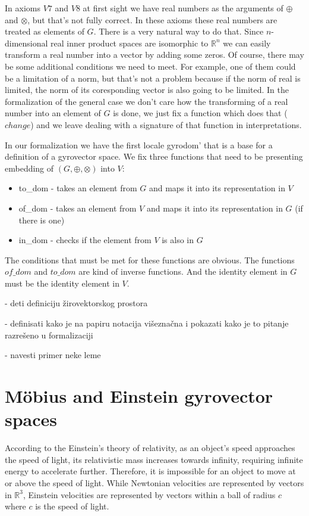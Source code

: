 \documentclass[a4paper]{article}
\theoremstyle{definition}
\begin{document}
In axioms $V7$ and $V8$ at first sight we have real numbers as the arguments of $\oplus$ and $\otimes$, but that's not fully correct. In these axioms these real numbers are treated as elements of $G$. There is a very natural way to do that. Since $n$-dimensional real inner product spaces are isomorphic to $\mathbb{R}^n$ we can easily transform a real number into a vector by adding some zeros. Of course, there may be some additional conditions we need to meet. For example, one of them could be a limitation of a norm, but that's not a problem because if the norm of real is limited,  the norm of its coresponding vector is also going to be limited. In the formalization of the general case we don't care how the transforming of a real number into an element of $G$ is done, we just fix a function which does that ($change$) and we leave dealing with a signature of that function in interpretations.


In our formalization we have the first locale gyrodom' that is a base for a definition of a gyrovector space. We fix three functions that need to be presenting embedding of $(G, \oplus, \otimes)$ into $V$: 
\begin{itemize}
\item to\_dom - takes an element from $G$ and maps it into its representation in $V$
\item of\_dom - takes an element from $V$ and maps it into its representation in $G$ (if there is one)
\item in\_dom - checks if the element from $V$ is also in $G$
\end{itemize}
The conditions that must be met for these functions are obvious. The functions $of\_dom$ and $to\_dom$ are kind of inverse functions. And the identity element in $G$ must be the identity element in $V$.

- deti definiciju žirovektorskog prostora

- definisati kako je na papiru notacija višeznačna i pokazati kako je to pitanje razrešeno u formalizaciji

- navesti primer neke leme

\section{M\"obius and Einstein gyrovector spaces}\label{sec:mobiuseinstein}

  
According to the Einstein's theory of relativity, as an object's speed approaches the speed of light, its relativistic mass increases towards infinity, requiring infinite energy to accelerate further. Therefore, it is impossible for an object to move at or above the speed of light. While Newtonian velocities are represented by vectors in $\mathbb{R}^3$, Einstein velocities are represented by vectors within a ball of radius $c$ where $c$ is the speed of light. 
\end{document}
